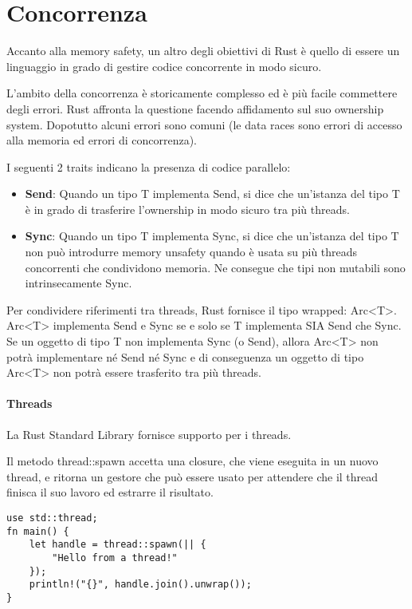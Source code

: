\newpage
\section{Concorrenza}
\label{sec:concorrenza}

Accanto alla memory safety, un altro degli obiettivi di Rust è quello di
essere un linguaggio in grado di gestire codice concorrente in modo sicuro.

L'ambito della concorrenza è storicamente complesso ed è più facile commettere
degli errori. Rust affronta la questione facendo affidamento sul suo ownership
system. Dopotutto alcuni errori sono comuni (le data races sono errori di
accesso alla memoria ed errori di concorrenza).

I seguenti 2 traits indicano la presenza di codice parallelo:

\begin{itemize}
\item \textbf{Send}: Quando un tipo T implementa Send, si dice che un’istanza
del tipo T è in grado di trasferire l'ownership in modo sicuro tra più threads.
\item \textbf{Sync}: Quando un tipo T implementa Sync, si dice che un'istanza
del tipo T non può introdurre memory unsafety quando è usata su più threads
concorrenti che condividono memoria.
Ne consegue che tipi non mutabili sono intrinsecamente Sync.
\end{itemize}

Per condividere riferimenti tra threads, Rust fornisce il tipo wrapped: Arc<T>.
Arc<T> implementa Send e Sync se e solo se T implementa SIA Send che Sync.
Se un oggetto di tipo T non implementa Sync (o Send), allora Arc<T> non potrà
implementare né Send né Sync e di conseguenza un oggetto di tipo Arc<T> non
potrà essere trasferito tra più threads.

\paragraph{Threads} La Rust Standard Library fornisce supporto per i threads.

Il metodo thread::spawn accetta una closure, che viene eseguita in un nuovo
thread, e ritorna un gestore che può essere usato per attendere che il thread
finisca il suo lavoro ed estrarre il risultato.

\begin{lstlisting}
use std::thread;
fn main() {
    let handle = thread::spawn(|| {
        "Hello from a thread!"
    });
    println!("{}", handle.join().unwrap());
}
\end{lstlisting}


